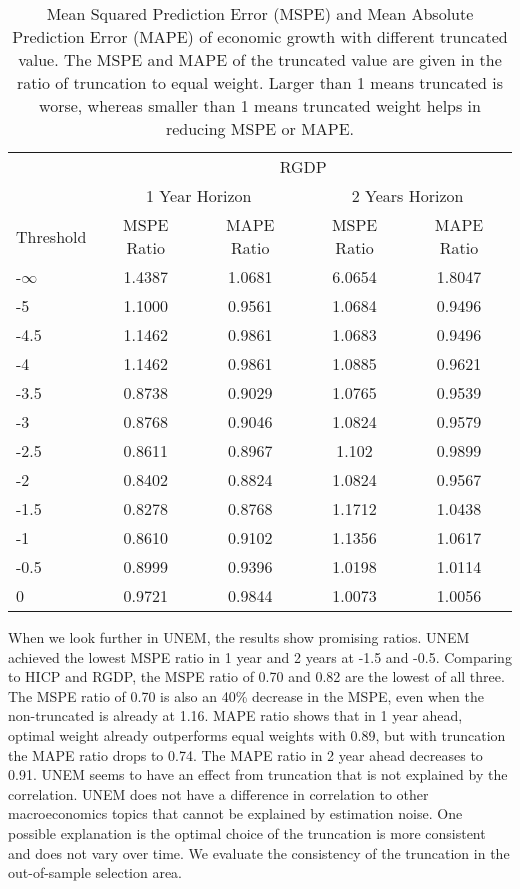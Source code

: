 \documentclass[11pt]{article}
\begin{document}
\begin{table}[!h]
	\centering
	\caption{Mean Squared Prediction Error (MSPE) and Mean Absolute Prediction Error (MAPE) of economic growth with different truncated value. The MSPE and MAPE of the truncated value are given in the ratio of truncation to equal weight. Larger than 1 means truncated is worse, whereas smaller than 1 means truncated weight helps in reducing MSPE or MAPE.}
	\label{tab: MSPE RGDP}
	\begin{tabular}{lcccc}
		\hline
		& \multicolumn{4}{c}{RGDP}                                                \\
		\cmidrule(lr){2-5}
		& \multicolumn{2}{c}{1 Year Horizon} & \multicolumn{2}{c}{2 Years Horizon} \\
		\cmidrule(lr){2-3} \cmidrule(lr){4-5}
		Threshold & MSPE Ratio &    MAPE Ratio    & MSPE Ratio &    MAPE Ratio    \\ \hline
		\hline
-$\infty$ & 1.4387 & 1.0681 & 6.0654 & 1.8047\\ 
-5 & 1.1000 & 0.9561 & 1.0684 & 0.9496\\ 
-4.5 & 1.1462 & 0.9861 & 1.0683 & 0.9496\\ 
-4 & 1.1462 & 0.9861 & 1.0885 & 0.9621\\ 
-3.5 & 0.8738 & 0.9029 & 1.0765 & 0.9539\\ 
-3 & 0.8768 & 0.9046 & 1.0824 & 0.9579\\ 
-2.5 & 0.8611 & 0.8967 & 1.102 & 0.9899\\ 
-2 & 0.8402 & 0.8824 & 1.0824 & 0.9567\\ 
-1.5 & 0.8278 & 0.8768 & 1.1712 & 1.0438\\ 
-1 & 0.8610 & 0.9102 & 1.1356 & 1.0617\\ 
-0.5 & 0.8999 & 0.9396 & 1.0198 & 1.0114\\ 
0 & 0.9721 & 0.9844 & 1.0073 & 1.0056\\  \hline
	\end{tabular}
\end{table}


When we look further in UNEM, the results show promising ratios. UNEM achieved the lowest MSPE ratio in 1 year and 2 years at -1.5 and -0.5. Comparing to HICP and RGDP, the MSPE ratio of 0.70 and 0.82 are the lowest of all three. The MSPE ratio of 0.70 is also an 40\% decrease in the MSPE, even when the non-truncated is already at 1.16. MAPE ratio shows that in 1 year ahead, optimal weight already outperforms equal weights with 0.89, but with truncation the MAPE ratio drops to 0.74. The MAPE ratio in 2 year ahead decreases to 0.91. UNEM seems to have an effect from truncation that is not explained by the correlation. UNEM does not have a difference in correlation to other macroeconomics topics that cannot be explained by estimation noise. One possible explanation is the optimal choice of the truncation is more consistent and does not vary over time. We evaluate the consistency of the truncation in the out-of-sample selection area.
\end{document}
